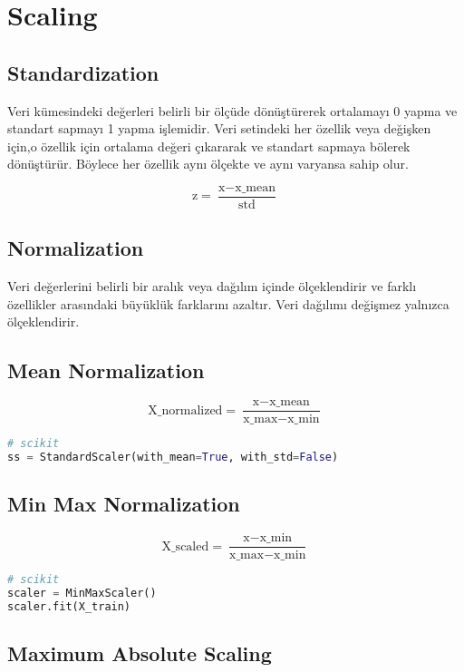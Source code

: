 \section{Scaling}

\subsection{Standardization}
Veri kümesindeki değerleri belirli bir ölçüde dönüştürerek ortalamayı 0 yapma ve standart sapmayı 1 yapma işlemidir. Veri setindeki her özellik veya değişken için,o özellik için ortalama değeri çıkararak ve standart sapmaya bölerek dönüştürür. Böylece her özellik aynı ölçekte ve aynı varyansa sahip olur.

\[\text{z} = \frac{\text{x} - \text{x\_mean}}{\text{std}}\]

\subsection{Normalization}
Veri değerlerini belirli bir aralık veya dağılım içinde ölçeklendirir ve farklı özellikler arasındaki büyüklük farklarını azaltır. Veri dağılımı değişmez yalnızca ölçeklendirir.

\subsection{Mean Normalization}

\[\text{X\_normalized} = \frac{\text{x} - \text{x\_mean}}{\text{x\_max} - \text{x\_min}}\]

\begin{lstlisting}[language=Python]
# scikit
ss = StandardScaler(with_mean=True, with_std=False)
\end{lstlisting}

\subsection{Min Max Normalization}

\[\text{X\_scaled} = \frac{\text{x} - \text{x\_min}}{\text{x\_max} - \text{x\_min}}\]

\begin{lstlisting}[language=Python]
# scikit
scaler = MinMaxScaler()
scaler.fit(X_train)
\end{lstlisting}

\subsection{Maximum Absolute Scaling}


